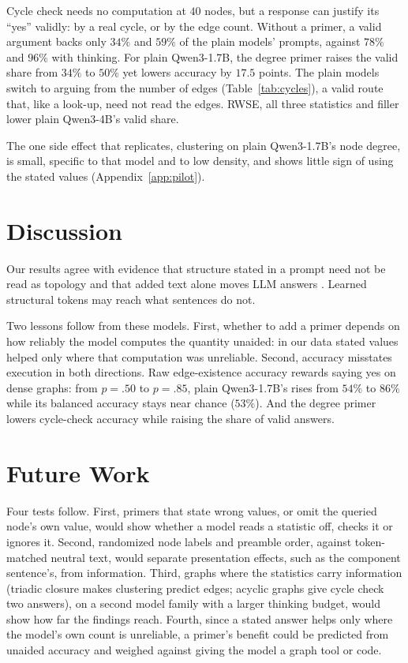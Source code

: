 \documentclass[11pt]{article}
\begin{document}
Cycle check needs no computation at $40$ nodes, but a response can justify its ``yes'' validly: by a real cycle, or by the edge count. Without a primer, a valid argument backs only $34\%$ and $59\%$ of the plain models' prompts, against $78\%$ and $96\%$ with thinking. %
For plain Qwen3-1.7B, the degree primer raises the valid share from $34\%$ to $50\%$ yet lowers accuracy by $17.5$ points. The plain models switch to arguing from the number of edges (Table~\ref{tab:cycles}), a valid route that, like a look-up, need not read the edges. RWSE, all three statistics and filler lower plain Qwen3-4B's valid share. %

The one side effect that replicates, clustering on plain Qwen3-1.7B's node degree, is small, specific to that model and to low density, and shows little sign of using the stated values (Appendix~\ref{app:pilot}).

\section{Discussion}
\label{sec:discussion}
Our results agree with evidence that structure stated in a prompt need not be read as topology \citep{huang2024can} and that added text alone moves LLM answers \citep{shi2023distracted,levy2024sametask}. Learned structural tokens \citep{perozzi2024letyourgraph} may reach what sentences do not.

Two lessons follow from these models. First, whether to add a primer depends on how reliably the model computes the quantity unaided: in our data stated values helped only where that computation was unreliable. Second, accuracy misstates execution in both directions. Raw edge-existence accuracy rewards saying yes on dense graphs: from $p=.50$ to $p=.85$, plain Qwen3-1.7B's rises from $54\%$ to $86\%$ while its balanced accuracy stays near chance ($53\%$). And the degree primer lowers cycle-check accuracy while raising the share of valid answers. %

\section{Future Work}
\label{sec:future}
Four tests follow. First, primers that state wrong values, or omit the queried node's own value, would show whether a model reads a statistic off, checks it or ignores it. Second, randomized node labels and preamble order, against token-matched neutral text, would separate presentation effects, such as the component sentence's, from information. Third, graphs where the statistics carry information (triadic closure makes clustering predict edges; acyclic graphs give cycle check two answers), on a second model family with a larger thinking budget, would show how far the findings reach. Fourth, since a stated answer helps only where the model's own count is unreliable, a primer's benefit could be predicted from unaided accuracy and weighed against giving the model a graph tool or code.
\end{document}
